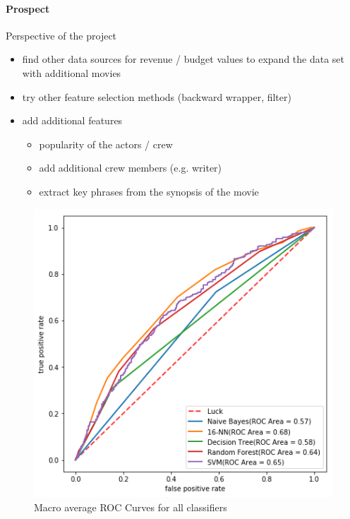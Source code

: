 \paragraph{Prospect}
Perspective of the project
\begin{itemize}
	\item find other data sources for revenue / budget values to expand the data set with additional movies
	\item try other feature selection methods (backward wrapper, filter)
	\item add additional features
	\begin{itemize}
		\item popularity of the actors / crew
		\item add additional crew members (e.g. writer)
		\item extract key phrases from the synopsis of the movie
	\end{itemize}
\end{itemize}

\label{cha:prospect}
\begin{figure}[h]
	\includegraphics[width=\textwidth]{images/roc.png}
	\caption{Macro average ROC Curves for all classifiers}
	\label{img:roc}
\end{figure}
\FloatBarrier